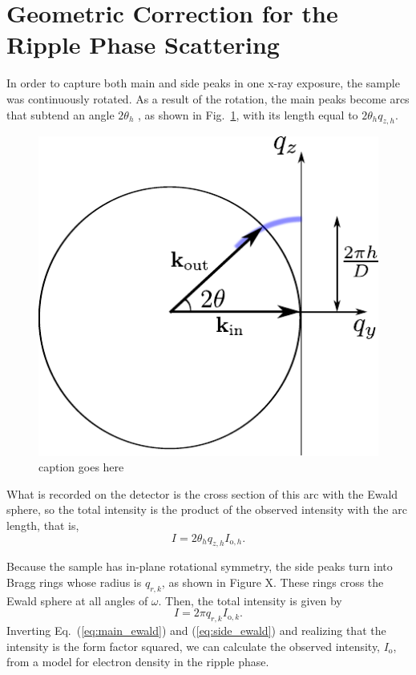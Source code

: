 \documentclass[12pt,letterpaper]{article}
\begin{document}
\section{Geometric Correction for the Ripple Phase Scattering}
In order to capture both main and side peaks in one x-ray exposure, 
the sample was continuously rotated. As a result of the rotation, 
the main peaks become arcs that subtend an angle $2\theta_{h}$ ,
as shown in Fig.~\ref{fig:ewald_main}, with its length
equal to $2\theta_{h}q_{z,h}$.  
\begin{figure}[htbp]
  \centering
  \includegraphics[scale=1]{figures/ewald_main}
  \caption{caption goes here}
  \label{fig:ewald_main}
\end{figure}
What is recorded on the detector is the cross section of this arc with the 
Ewald sphere, so the total intensity is the product of the observed intensity
with the arc length, that is, 
\begin{equation}
  I = 2\theta_{h}q_{z,h} I_{\mathrm{o},h}. \label{eq:main_ewald}
\end{equation}

Because the sample has in-plane rotational symmetry, the side peaks turn
into Bragg rings whose radius is $q_{r,k}$, as shown in Figure X. 
These rings cross the Ewald sphere
at all angles of $\omega$. Then, the total intensity is given by
\begin{equation}
  I=2\pi q_{r,k} I_{\mathrm{o},k}. \label{eq:side_ewald}
\end{equation}
Inverting Eq.~(\ref{eq:main_ewald}) and (\ref{eq:side_ewald}) 
and realizing that the intensity is the form factor
squared, we can calculate the observed intensity, $I_\mathrm{o}$, 
from a model for electron density in the ripple phase.
\end{document}
